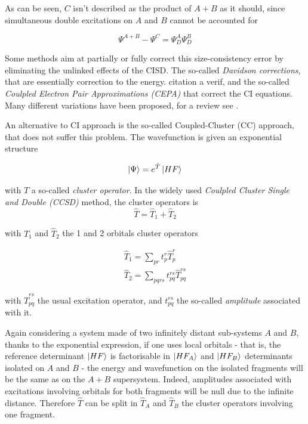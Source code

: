 \documentclass[./thesis.tex]{subfiles}
\begin{document}
As can be seen, $C$ isn't described as the product of $A+B$ as it should, since simultaneous double excitations on $A$ and $B$ cannot be accounted for

\begin{equation}
\Psi^{A+B} - \Psi^C  = \Psi_{D}^A \Psi_{D}^B
\end{equation}

Some methods aim at partially or fully correct this size-consistency error by eliminating the unlinked effects of the CISD. The so-called \emph{Davidson corrections}, that are essentially correction to the energy\cite{Langhoff_1974}. \alert{citation a verif}, and the so-called \emph{Coulpled Electron Pair Approximations (CEPA)} that correct the CI equations\cite{Kelly_1963,Kelly_1964,Meyer_1971,Meyer_1973,Meyer_1974,Ahlrichs_1975}. Many different variations have been proposed, for a review see \cite{Koch_1981}.

An alternative to CI approach is the so-called Coupled-Cluster (CC) approach, that does not suffer this problem. The wavefunction is given an exponential structure

\begin{equation}
\ket \Psi = e^{\hat T} \ket {HF}
\end{equation}

with $\hat T$ a so-called \emph{cluster operator}. In the widely used \emph {Coulpled Cluster Single and Double (CCSD)} method, the cluster operators is
\begin{equation}
\hat T = \hat T_1 + \hat T_2
\end{equation}

with $\hat T_1$ and $\hat T_2$ the 1 and 2 orbitals cluster operators 

\begin{align}
\hat T_1 = \sum_{pr} t_p^r \hat T_p^r \\
\hat T_2 = \sum_{pqrs} t_{pq}^{rs} \hat T_{pq}^{rs}
\end{align}

with $\hat T_{pq}^{rs}$ the usual excitation operator, and $t_{pq}^{rs}$ the so-called \emph{amplitude} associated with it.

Again considering a system made of two infinitely distant sub-systems $A$ and $B$, thanks to the exponential expression, if one uses local orbitals - that is, the reference determinant $\ket {HF}$ is factorisable in $\ket{HF_A}$ and $\ket{HF_B}$ determinants isolated on $A$ and $B$ - the energy and wavefunction on the isolated fragments will be the same as on the $A+B$ supersystem.
Indeed, amplitudes associated with excitations involving orbitals for both fragments will be null due to the infinite distance. Therefore $\hat T$ can be split in $\hat T_A$ and $\hat T_B$ the cluster operators involving one fragment.
\end{document}
